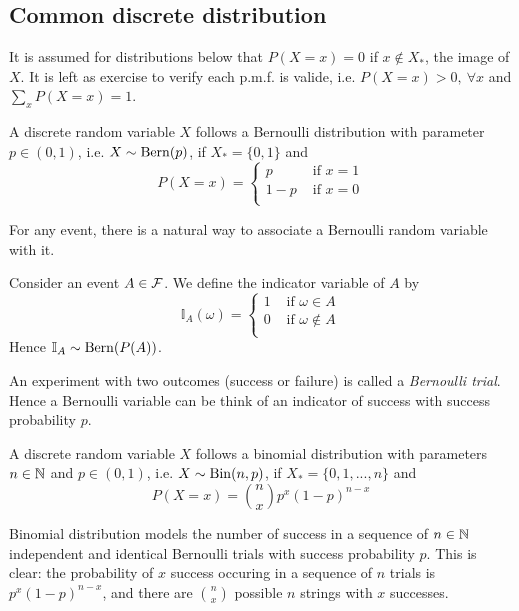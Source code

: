 \documentclass[11pt]{article}
\begin{document}
\subsection{Common discrete distribution}
It is assumed for distributions below that \(P(X=x)=0\) if \(x\notin X_*\), the image of \(X\). It is left as exercise to verify each p.m.f. is valide, i.e. \(P(X=x)>0,\:\forall x\) and \(\sum_xP(X=x)=1\).
\begin{definition}
  A discrete random variable \(X\) follows a Bernoulli distribution with parameter \(p\in(0,1)\), i.e. \(X\sim \rm{Bern}(p)\), if \(X_*=\{0,1\}\) and
  \begin{equation*}
    P(X=x)=\begin{cases}
      p & \text{ if } x=1 \\
      1-p & \text{ if } x=0\\
    \end{cases}
  \end{equation*}
\end{definition}
For any event, there is a natural way to associate a Bernoulli random variable with it. 
\begin{definition}
  Consider an event \(A\in\cal{F}\). We define the indicator variable of \(A\) by
  \[\mathbb{I}_A(\omega)=\begin{cases}
    1 & \text{ if } \omega\in A\\
    0 & \text{ if } \omega\notin A\\
  \end{cases}\]
  Hence \(\mathbb{I}_A\sim \rm{Bern}(P(A))\).
\end{definition}
An experiment with two outcomes (success or failure) is called a \emph{Bernoulli trial}. Hence a Bernoulli variable can be think of an indicator of success with success probability \(p\).

\begin{definition}
  A discrete random variable \(X\) follows a binomial distribution with parameters \(n\in\N\) and \(p\in(0,1)\), i.e. \(X\sim \rm{Bin}(n,p)\), if \(X_*=\{0,1,...,n\}\) and
  \[P(X=x)=\binom{n}{x}p^x(1-p)^{n-x}\]
\end{definition}
Binomial distribution models the number of success in a sequence of \(n\in\N\) independent and identical Bernoulli trials with success probability \(p\). This is clear: the probability of \(x\) success occuring in a sequence of \(n\) trials is \(p^x(1-p)^{n-x}\), and there are \(\binom{n}{x}\) possible \(n\) strings with \(x\) successes. 
\end{document}
